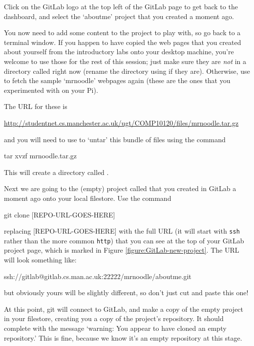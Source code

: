 Click on the GitLab logo at the top left of the GitLab page to get back to the dashboard, and select the `aboutme' project that you created a moment ago. 

You now need to add some content to the project to play with, so go back to a terminal window. If you happen to have copied the web pages that you created about yourself from the introductory labs onto your desktop machine, you're welcome to use those for the rest of this session; just make sure they are \emph{not} in a directory called  right now (rename the directory using  if they are). Otherwise, use  to fetch the sample `mrnoodle' webpages again (these are the ones that you experimented with on your Pi).

The URL for these is 

\url{http://studentnet.cs.manchester.ac.uk/ugt/COMP10120/files/mrnoodle.tar.gz}

and you will need to use  to `untar' this bundle of files using the command

\begin{ttoutenv}
tar xvzf mrnoodle.tar.gz
\end{ttoutenv}

This will create a directory called . 

Next we are going to  the (empty) project called  that you created in GitLab a moment ago onto your local filestore. Use the  command

\begin{ttoutenv}
git clone [REPO-URL-GOES-HERE]
\end{ttoutenv}

replacing [REPO-URL-GOES-HERE] with the full URL (it will start with \texttt{ssh} rather than the more common \texttt{http}) that you can see at the top of your GitLab  project page, which is marked \protect{} in Figure \ref{figure:GitLab-new-project}. The URL will look something like:

\begin{ttoutenv}
ssh://gitlab@gitlab.cs.man.ac.uk:22222/mrnoodle/aboutme.git
\end{ttoutenv}

but obviously yours will be slightly different, so don't just cut and paste this one!

At this point, git will connect to GitLab, and make a copy of the empty  project in your filestore, creating you a copy of the project's repository. It should complete with the message `warning: You appear to have cloned an empty repository.' This is fine, because we know it's an empty repository at this stage.


